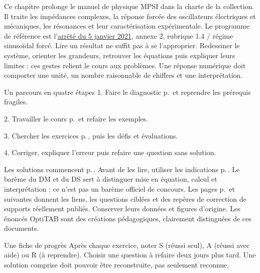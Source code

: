 \thispagestyle{mpsiFront}
Ce chapitre prolonge le manuel de physique MPSI dans la charte de la collection. Il traite les impédances complexes, la réponse forcée des oscillateurs électriques et mécaniques, les résonances et leur caractérisation expérimentale. Le programme de référence est l’\href{https://www.education.gouv.fr/bo/21/Special1/ESRS2035779A.htm}{arrêté du 5 janvier 2021}, annexe 2, rubrique 1.4 / régime sinusoïdal forcé.
Lire un résultat ne suffit pas à se l’approprier. Redessiner le système, orienter les grandeurs, retrouver les équations puis expliquer leurs limites : ces gestes relient le cours aux problèmes. Une réponse numérique doit comporter une unité, un nombre raisonnable de chiffres et une interprétation.
\begin{loi}{Un parcours en quatre étapes}
1. Faire le diagnostic p.\,\pageref{diagnostic} et reprendre les prérequis fragiles.\par
2. Travailler le cours p.\,\pageref{cours-1} et refaire les exemples.\par
3. Chercher les exercices p.\,\pageref{td1}, puis les défis et évaluations.\par
4. Corriger, expliquer l’erreur puis refaire une question sans solution.
\end{loi}
Les solutions commencent p.\,\pageref{corr-diag}. Avant de les lire, utiliser les indications p.\,\pageref{indices}. Le barème du DM et du DS sert à distinguer mise en équation, calcul et interprétation ; ce n’est pas un barème officiel de concours.
Les pages p.\,\pageref{sources-1} et suivantes donnent les liens, les questions ciblées et des repères de correction de supports réellement publiés. Conserver leurs données et figures d’origine. Les énoncés OptiTAB sont des créations pédagogiques, clairement distinguées de ces documents.
\begin{methode}{Une fiche de progrès}
Après chaque exercice, noter S (réussi seul), A (réussi avec aide) ou R (à reprendre). Choisir une question à refaire deux jours plus tard. Une solution comprise doit pouvoir être reconstruite, pas seulement reconnue.
\end{methode}


